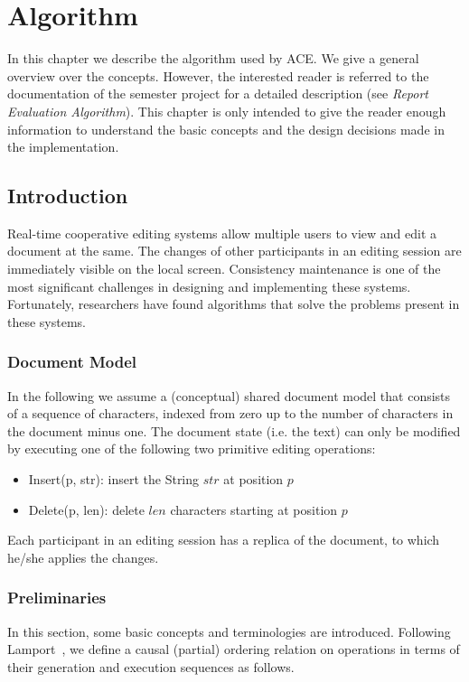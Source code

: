 \chapter{Algorithm}
\label{chapter:algorithm}

In this chapter we describe the algorithm used by ACE. We give a general
overview over the concepts. However, the interested reader is referred to
the documentation of the semester project for a detailed description (see 
\emph{Report Evaluation Algorithm}). This chapter is only intended to give
the reader enough information to understand the basic concepts and the
design decisions made in the implementation.



\section{Introduction}
Real-time cooperative editing systems allow multiple users to view and edit a
document at the same. The changes of other participants in an editing
session are immediately visible on the local screen. Consistency maintenance
is one of the most significant challenges in designing and implementing
these systems. Fortunately, researchers have found algorithms that solve the
problems present in these systems.


\subsection{Document Model}
In the following we assume a (conceptual) shared document model that consists 
of a sequence of characters, indexed from zero up to the number of characters in
the document minus one. The document state (i.e. the text) can only be 
modified by executing one of the following two primitive editing operations:

\begin{itemize}
 \item Insert(p, str): insert the String $str$ at position $p$
 \item Delete(p, len): delete $len$ characters starting at position $p$
\end{itemize}

Each participant in an editing session has a replica of the document, to which
he/she applies the changes.


\subsection{Preliminaries}
In this section, some basic concepts and terminologies are introduced. Following Lamport~\cite{lamport78}, we define a causal (partial) ordering relation on operations in terms of their generation and execution sequences as follows.

